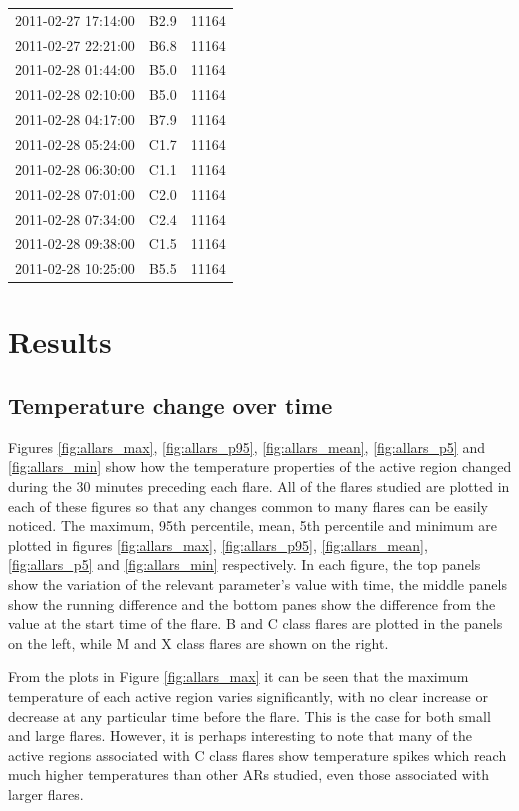 \documentclass[referee,a4paper,12pt]{swsc}
\begin{document}
\begin{linenumbers}
\begin{longtable}{c|c|c}
		2011-02-27 17:14:00 & B2.9 & 11164 \\ 
		2011-02-27 22:21:00 & B6.8 & 11164 \\ 
		2011-02-28 01:44:00 & B5.0 & 11164 \\ 
		2011-02-28 02:10:00 & B5.0 & 11164 \\ 
		2011-02-28 04:17:00 & B7.9 & 11164 \\ 
		2011-02-28 05:24:00 & C1.7 & 11164 \\ 
		2011-02-28 06:30:00 & C1.1 & 11164 \\ 
		2011-02-28 07:01:00 & C2.0 & 11164 \\ 
		2011-02-28 07:34:00 & C2.4 & 11164 \\ 
		2011-02-28 09:38:00 & C1.5 & 11164 \\ 
		2011-02-28 10:25:00 & B5.5 & 11164
	\label{tab:flares}
\end{longtable}

\section{Results}
\subsection{Temperature change over time}
Figures \ref{fig:allars_max}, \ref{fig:allars_p95}, \ref{fig:allars_mean}, \ref{fig:allars_p5} and \ref{fig:allars_min} show how the temperature properties of the active region changed during the 30 minutes preceding each flare.
All of the flares studied are plotted in each of these figures so that any changes common to many flares can be easily noticed.
The maximum, 95th percentile, mean, 5th percentile and minimum are plotted in figures \ref{fig:allars_max}, \ref{fig:allars_p95}, \ref{fig:allars_mean}, \ref{fig:allars_p5} and \ref{fig:allars_min} respectively.
In each figure, the top panels show the variation of the relevant parameter's value with time, the middle panels show the running difference and the bottom panes show the difference from the value at the start time of the flare.
B and C class flares are plotted in the panels on the left, while M and X class flares are shown on the right.

From the plots in Figure \ref{fig:allars_max} it can be seen that the maximum temperature of each active region varies significantly, with no clear increase or decrease at any particular time before the flare.
This is the case for both small and large flares.
However, it is perhaps interesting to note that many of the active regions associated with C class flares show temperature spikes which reach much higher temperatures than other ARs studied, even those associated with larger flares.


\end{linenumbers}
\end{document}
